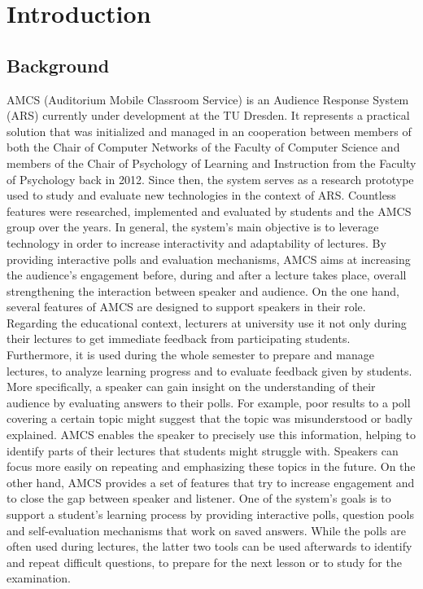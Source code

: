 
\chapter{Introduction}

\section{Background}

AMCS (Auditorium Mobile Classroom Service) is an Audience Response System (ARS) currently under development at the TU Dresden.
It represents a practical solution that was initialized and managed in an cooperation between members of both the Chair of Computer Networks of the Faculty of Computer Science and members of the Chair of Psychology of Learning and Instruction from the Faculty of Psychology back in 2012. Since then, the system serves as a research prototype used to study and evaluate new technologies in the context of ARS. Countless features were researched, implemented and evaluated by students and the AMCS group over the years.
\newline
\newline
In general, the system's main objective is to leverage technology in order to increase interactivity and adaptability of lectures. By providing interactive polls and evaluation mechanisms, AMCS aims at increasing the audience's engagement before, during and after a lecture takes place, overall strengthening the interaction between speaker and audience.
\newline
\newline
On the one hand, several features of AMCS are designed to support speakers in their role. Regarding the educational context, lecturers at university use it not only during their lectures to get immediate feedback from participating students. Furthermore, it is used during the whole semester to prepare and manage lectures, to analyze learning progress and to evaluate feedback given by students. More specifically, a speaker can gain insight on the understanding of their audience by evaluating answers to their polls. For example, poor results to a poll covering a certain topic might suggest that the topic was misunderstood or badly explained. AMCS enables the speaker to precisely use this information, helping to identify parts of their lectures that students might struggle with. Speakers can focus more easily on repeating and emphasizing these topics in the future.
\newline
\newline
On the other hand, AMCS provides a set of features that try to increase engagement and to close the gap between speaker and listener.
One of the system's goals is to support a student's learning process by providing interactive polls, question pools and self-evaluation mechanisms that work on saved answers. While the polls are often used during lectures, the latter two tools can be used afterwards to identify and repeat difficult questions, to prepare for the next lesson or to study for the examination. 
\newline
\newline
